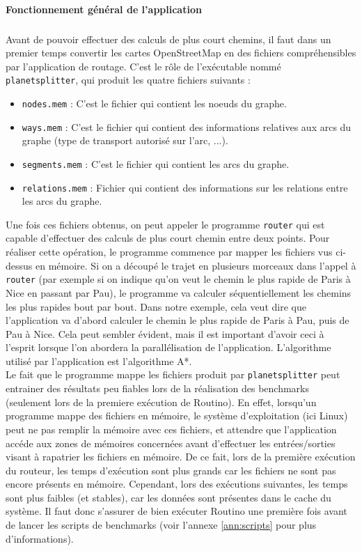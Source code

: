 \paragraph{Fonctionnement général de l'application}
\subparagraph{}

Avant de pouvoir effectuer des calculs de plus court chemins, il faut dans un 
premier temps convertir les cartes OpenStreetMap en des fichiers compréhensibles
par l'application de routage. C'est le rôle de l'exécutable nommé
\texttt{planetsplitter}, qui produit les quatre fichiers suivants :

\begin{itemize}
\item \texttt{nodes.mem} : C'est le fichier qui contient les noeuds du graphe.
\item \texttt{ways.mem} : C'est le fichier qui contient des informations 
relatives aux arcs du graphe (type de transport autorisé sur l'arc, ...).
\item \texttt{segments.mem} : C'est le fichier qui contient les arcs du graphe.
\item \texttt{relations.mem} : Fichier qui contient des informations sur les 
relations entre les arcs du graphe. \\
\end{itemize}

Une fois ces fichiers obtenus, on peut appeler le programme \texttt{router} qui 
est capable d'effectuer des calculs de plus court chemin entre deux points. 
Pour réaliser cette opération, le programme commence par mapper les fichiers 
vus ci-dessus en mémoire. Si on a découpé le trajet en plusieurs morceaux dans
l'appel à \texttt{router} (par exemple si on indique qu'on veut le chemin le 
plus rapide de Paris à Nice en passant par Pau), le programme va calculer 
séquentiellement les chemins les plus rapides bout par bout. Dans notre exemple,
cela veut dire que l'application va d'abord calculer le chemin le plus rapide de 
Paris à Pau, puis de Pau à Nice. Cela peut sembler évident, mais il est 
important d'avoir ceci à l'esprit lorsque l'on abordera la parallélisation de 
l'application. L'algorithme utilisé par l'application est l'algorithme A*. \\

Le fait que le programme mappe les fichiers produit par \texttt{planetsplitter} 
peut entrainer des résultats peu fiables lors de la réalisation des benchmarks
 (seulement lors de la premiere exécution de Routino). En effet, lorsqu'un 
programme mappe des fichiers en mémoire, le système d'exploitation (ici Linux) 
peut ne pas remplir la mémoire avec ces fichiers, et attendre que l'application 
accéde aux zones de mémoires concernées avant d'effectuer les entrées/sorties 
visant à rapatrier les fichiers en mémoire. De ce fait, lors de la première 
exécution du routeur, les temps d'exécution sont plus grands car les fichiers 
ne sont pas encore présents en mémoire. Cependant, lors des exécutions suivantes,
les temps sont plus faibles (et stables), car les données sont présentes dans le
 cache du système. Il faut donc s'assurer de bien exécuter Routino une première 
fois avant de lancer les scripts de benchmarks (voir l'annexe \ref{ann:scripts}
pour plus d'informations). 
 

